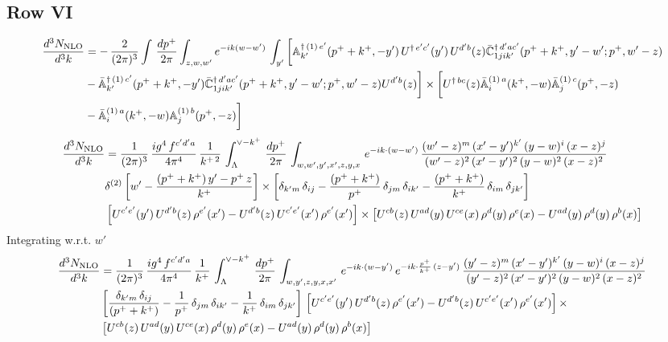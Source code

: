 \documentclass[9pt]{article}
\def\mf#1{\mathbb{#1}}
\numberwithin{equation}{section}
\begin{document}
\subsection{Row VI\,}
\begin{align}
     \frac{d^{3}N_{\rm NLO}}{d^{3}k} & =  -\, \frac{2}{(2\pi)^{3}} \int\, \frac{dp^{+}}{2\pi}\int_{z,w,w^{\prime}} e^{-ik(w-w^{\prime})}\,\int_{y^{\prime}}\bigg[\mf{A}^{\dagger\, (1)\,e^{\prime}}_{k^{\prime}}(p^{+}+k^{+},-y^{\prime})\,U^{\dagger\, e^{\prime}c^{\prime}}(y^{\prime})\,U^{d^{\prime}b}(z) \Bar{\mf{C}}^{\dagger\, d^{\prime}ac^{\prime}}_{1jik^{\prime}}(p^{+}+k^{+},y^{\prime}-w^{\prime}; p^{+},w^{\prime}-z) \notag \\ & -\Bar{\mf{A}}^{\dagger\, (1)\,c^{\prime}}_{k^{\prime}}(p^{+}+k^{+},-y^{\prime})\Bar{\mf{C}}^{\dagger\, d^{\prime}ac^{\prime}}_{1jik^{\prime}}(p^{+}+k^{+},y^{\prime}-w^{\prime}; p^{+},w^{\prime}-z)U^{d^{\prime}b}(z)\bigg] \times \bigg[U^{\dagger\,bc}(z)\Bar{\mf{A}}^{(1)\, a}_{i}(k^{+},- w)\Bar{\mf{A}}^{(1)\, c}_{j}(p^{+},-z)\notag \\ & -\Bar{\mf{A}}^{(1)\, a}_{i}(k^{+},- w) \mf{A}^{(1)\, b}_{j}(p^{+},- z)\bigg]\nonumber
\end{align}
\begin{align}
     \frac{d^{3}N_{\rm NLO}}{d^{3}k} & =  \frac{1}{(2\pi)^{3}}\,\frac{ig^{4}\,f^{c'd'a}}{4\pi^{4}}\, \frac{1}{k^{+\,2}}\,\int_{\Lambda}^{\vee-k^{+}}\, \frac{dp^{+}}{2\pi}\, \int_{w,w',y',x',z,y,x}\, e^{-ik\cdot (w-w')}\, \frac{(w'-z)^{m}\,(x'-y')^{k'}\,(y-w)^{i}\,(x-z)^{j}}{(w'-z)^{2}\,(x'-y')^{2}\,(y-w)^{2}\,(x-z)^{2}}\notag \\ & \delta^{(2)}\left[w'-\frac{(p^{+}+k^{+})\,y'-p^{+}\,z}{k^{+}}\right]\times \left[\delta_{k'm}\,\delta_{ij}-\frac{(p^{+}+k^{+})}{p^{+}}\,\delta_{jm}\,\delta_{ik'}-\frac{(p^{+}+k^{+})}{k^{+}}\, \delta_{im}\, \delta_{jk'}\right]\notag \\ & \left[U^{c'e'}(y')\,U^{d'b}(z)\,\rho^{e'}(x')-U^{d'b}(z)\,U^{c'e'}(x')\,\rho^{e'}(x')\right]\times \left[U^{cb}(z)\,U^{ad}(y)\,U^{ce}(x)\,\rho^{d}(y)\,\rho^{e}(x)-U^{ad}(y)\,\rho^{d}(y)\,\rho^{b}(x)\right]
\end{align}
Integrating w.r.t. $w'$
\begin{align}
     \frac{d^{3}N_{\rm NLO}}{d^{3}k} & = \frac{1}{(2\pi)^{3}}\, \frac{ig^{4}\,f^{c'd'a}}{4\pi^{4}}\, \frac{1}{k^{+}}\,\int_{\Lambda}^{\vee-k^{+}}\, \frac{dp^{+}}{2\pi}\, \int_{w,y',z,y,x,x'}\, e^{-ik\cdot (w-y')}\, e^{-ik\cdot \frac{p^{+}}{k^{+}}\,(z-y')}\, \frac{(y'-z)^{m}\,(x'-y')^{k'}\,(y-w)^{i}\,(x-z)^{j}}{(y'-z)^{2}\,(x'-y')^{2}\,(y-w)^{2}\,(x-z)^{2}}\notag \\ & \left[\frac{\delta_{k'm}\,\delta_{ij}}{(p^{+}+k^{+})}-\frac{1}{p^{+}}\,\delta_{jm}\,\delta_{ik'}-\frac{1}{k^{+}}\, \delta_{im}\, \delta_{jk'}\right]\, \left[U^{c'e'}(y')\,U^{d'b}(z)\,\rho^{e'}(x')-U^{d'b}(z)\,U^{c'e'}(x')\,\rho^{e'}(x')\right]\times\notag \\ &  \left[U^{cb}(z)\,U^{ad}(y)\,U^{ce}(x)\,\rho^{d}(y)\,\rho^{e}(x)-U^{ad}(y)\,\rho^{d}(y)\,\rho^{b}(x)\right]
\end{align}
\end{document}

